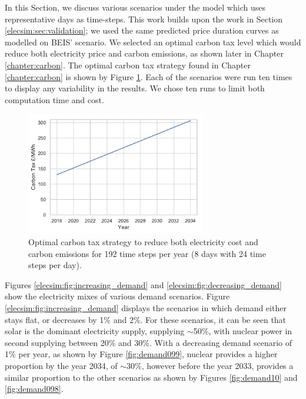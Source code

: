 In this Section, we discuss various scenarios under the model which uses representative days as time-steps. This work builds upon the work in Section \ref{elecsim:sec:validation}; we used the same predicted price duration curves as modelled on BEIS' scenario. We selected an optimal carbon tax level which would reduce both electricity price and carbon emissions, as shown later in Chapter \ref{chapter:carbon}. The optimal carbon tax strategy found in Chapter \ref{chapter:carbon} is shown by Figure \ref{elecsim:fig:optimal_carbon_tax_strategy}. Each of the scenarios were run ten times to display any variability in the results. We chose ten runs to limit both computation time and cost.



\begin{figure}
	\centering
	\includegraphics[width=0.7\textwidth, keepaspectratio]{Chapter4/figures/scenarios/representative-day-scenarios/optimal_carbon_strategy.pdf}
	\caption{Optimal carbon tax strategy to reduce both electricity cost and carbon emissions for 192 time steps per year (8 days with 24 time steps per day).}
	\label{elecsim:fig:optimal_carbon_tax_strategy}
\end{figure}

Figures \ref{elecsim:fig:increasing_demand} and \ref{elecsim:fig:decreasing_demand} show the electricity mixes of various demand scenarios. Figure \ref{elecsim:fig:increasing_demand} displays the scenarios in which demand either stays flat, or decreases by 1\% and 2\%. For these scenarios, it can be seen that solar is the dominant electricity supply, supplying ${\sim}$50\%, with nuclear power in second supplying between 20\% and 30\%. With a decreasing demand scenario of 1\% per year, as shown by Figure \ref{fig:demand099}, nuclear provides a higher proportion by the year 2034, of ${\sim}$30\%, however before the year 2033, provides a similar proportion to the other scenarios as shown by Figures \ref{fig:demand10} and \ref{fig:demand098}.

